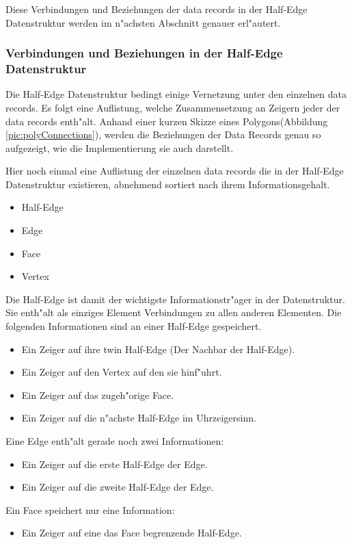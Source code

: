 \documentclass[pagesize, paper=a4, fontsize=12pt,titlepage=true, headings=small, headnosepline, abstractoff, liststotoc, nochapterprefix, plainheadsepline]{scrreprt}
\newcommand{\HES}{Half-Edge Datenstruktur }
\begin{document}
Diese Verbindungen und Beziehungen der data records in der \HES werden im n"achsten Abschnitt genauer erl"autert.

			\subsubsection {Verbindungen und Beziehungen in der \HES}
				Die \HES bedingt einige Vernetzung unter den einzelnen data records. Es folgt eine Auflistung, welche Zusammensetzung an Zeigern jeder der data records enth"alt.
Anhand einer kurzen Skizze eines Polygons(Abbildung \ref{pic:polyConnections}), werden die Beziehungen der Data Records genau so aufgezeigt, wie die Implementierung sie auch darstellt.

Hier noch einmal eine Auflistung der einzelnen data records die in der \HES existieren, abnehmend sortiert nach ihrem Informationsgehalt.
\begin{itemize}
\item Half-Edge
\item Edge
\item Face
\item Vertex
\end{itemize}

Die Half-Edge ist damit der wichtigste Informationstr"ager in der Datenstruktur. Sie enth"alt als einziges Element Verbindungen zu allen anderen Elementen.
Die folgenden Informationen sind an einer Half-Edge gespeichert.
\begin{itemize}
\item Ein Zeiger auf ihre twin Half-Edge (Der Nachbar der Half-Edge).
\item Ein Zeiger auf den Vertex auf den sie hinf"uhrt.
\item Ein Zeiger auf das zugeh"orige Face.
\item Ein Zeiger auf die n"achste Half-Edge im Uhrzeigersinn.
\end{itemize}

Eine Edge enth"alt gerade noch zwei Informationen:
\begin{itemize}
\item Ein Zeiger auf die erste Half-Edge der Edge.
\item Ein Zeiger auf die zweite Half-Edge der Edge.
\end{itemize}

Ein Face speichert nur eine Information:
\begin{itemize}
\item Ein Zeiger auf eine das Face begrenzende Half-Edge.
\end{itemize}
\end{document}
